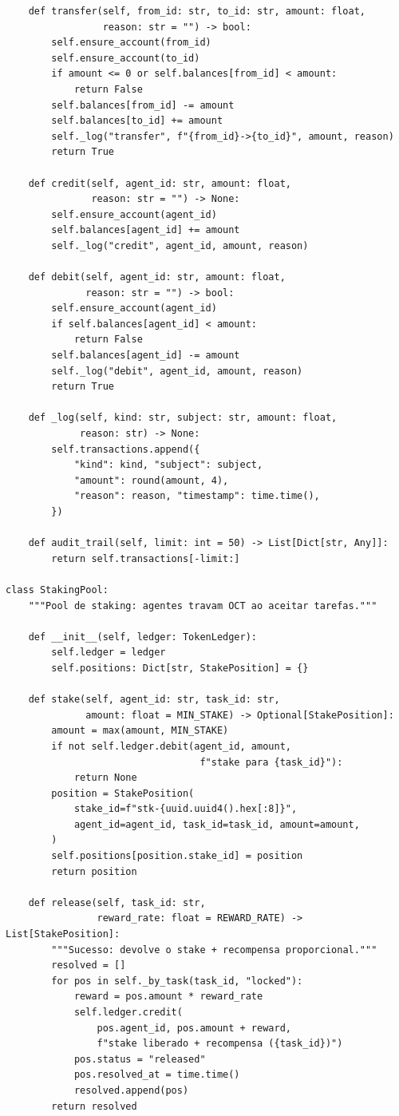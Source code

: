 \begin{verbatim}
    def transfer(self, from_id: str, to_id: str, amount: float,
                 reason: str = "") -> bool:
        self.ensure_account(from_id)
        self.ensure_account(to_id)
        if amount <= 0 or self.balances[from_id] < amount:
            return False
        self.balances[from_id] -= amount
        self.balances[to_id] += amount
        self._log("transfer", f"{from_id}->{to_id}", amount, reason)
        return True

    def credit(self, agent_id: str, amount: float,
               reason: str = "") -> None:
        self.ensure_account(agent_id)
        self.balances[agent_id] += amount
        self._log("credit", agent_id, amount, reason)

    def debit(self, agent_id: str, amount: float,
              reason: str = "") -> bool:
        self.ensure_account(agent_id)
        if self.balances[agent_id] < amount:
            return False
        self.balances[agent_id] -= amount
        self._log("debit", agent_id, amount, reason)
        return True

    def _log(self, kind: str, subject: str, amount: float,
             reason: str) -> None:
        self.transactions.append({
            "kind": kind, "subject": subject,
            "amount": round(amount, 4),
            "reason": reason, "timestamp": time.time(),
        })

    def audit_trail(self, limit: int = 50) -> List[Dict[str, Any]]:
        return self.transactions[-limit:]

class StakingPool:
    """Pool de staking: agentes travam OCT ao aceitar tarefas."""

    def __init__(self, ledger: TokenLedger):
        self.ledger = ledger
        self.positions: Dict[str, StakePosition] = {}

    def stake(self, agent_id: str, task_id: str,
              amount: float = MIN_STAKE) -> Optional[StakePosition]:
        amount = max(amount, MIN_STAKE)
        if not self.ledger.debit(agent_id, amount,
                                  f"stake para {task_id}"):
            return None
        position = StakePosition(
            stake_id=f"stk-{uuid.uuid4().hex[:8]}",
            agent_id=agent_id, task_id=task_id, amount=amount,
        )
        self.positions[position.stake_id] = position
        return position

    def release(self, task_id: str,
                reward_rate: float = REWARD_RATE) -> List[StakePosition]:
        """Sucesso: devolve o stake + recompensa proporcional."""
        resolved = []
        for pos in self._by_task(task_id, "locked"):
            reward = pos.amount * reward_rate
            self.ledger.credit(
                pos.agent_id, pos.amount + reward,
                f"stake liberado + recompensa ({task_id})")
            pos.status = "released"
            pos.resolved_at = time.time()
            resolved.append(pos)
        return resolved


\end{verbatim}

